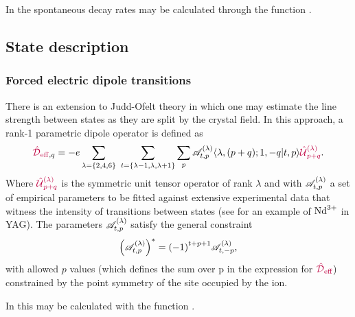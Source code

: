 \documentclass[11pt, twoside,openright]{article}
\begin{document}
In \qlanth the spontaneous decay rates may be calculated through the function .

 

\subsection{State description}

\subsubsection{Forced electric dipole transitions}

There is an extension to Judd-Ofelt theory \cite{may_electric_1987,may_optical_1987,may_circular_1987,reid_anisotropic_1983,reid_lanthanide_1984,burdick_ambiguities_1999,newman_parametrization_1975,reid_recent_1992,reid_superposition_model_1987,reid_electric_1983,moran_measurement_1992,moran_parametric_1990,may_crystals_1989,may_parametric_1989,berry_optical_1988,burdick_energy_level_1994} in which one may estimate the line strength between states as they are split by the crystal field. In this approach, a rank-1 parametric dipole operator is defined as \cite{newman_crystal_2000} 
\begin{equation}
	\textcolor{purple}{{\textcolor{purple}{\hat{\mathcal{D}}}_\text{eff}}}_{,q} = -e \sum_{\lambda=\{2,4,6\}} \,\, \sum_{t=\{\lambda-1,\lambda,\lambda+1\}} \sum_p \mathscr{A}^{(\lambda)}_{t,p} \langle \lambda,(p+q);1,-q|t,p\rangle \textcolor{purple}{\textcolor{purple}{\hat{\mathcal{U}}}^{(\lambda)}_{p+q}} \label{eqn:effective-dipole}.
\end{equation}
Where $\textcolor{purple}{\textcolor{purple}{\hat{\mathcal{U}}}^{(\lambda)}_{p+q}}$ is the symmetric unit tensor operator of rank $\lambda$ and with $\mathscr{A}^{(\lambda)}_{t,p}$ a set of empirical parameters to be fitted against extensive experimental data that witness the intensity of transitions between states (see \cite{burdick_energy_level_1994} for an example of $\textrm{Nd}^{3+}$ in YAG). The parameters $\mathscr{A}^{(\lambda)}_{t,p}$ satisfy the general constraint
\begin{equation}
	\left( \mathscr{A}^{(\lambda)}_{t,p} \right)^* = {(-1)}^{t+p+1} \mathscr{A}^{(\lambda)}_{t,-p},
\end{equation}
with allowed $p$ values (which defines the sum over p in the expression for $\textcolor{purple}{{\textcolor{purple}{\hat{\mathcal{D}}}_\text{eff}}}$) constrained by the point symmetry of the site occupied by the ion.

In \qlanth this may be calculated with the function .
\end{document}
